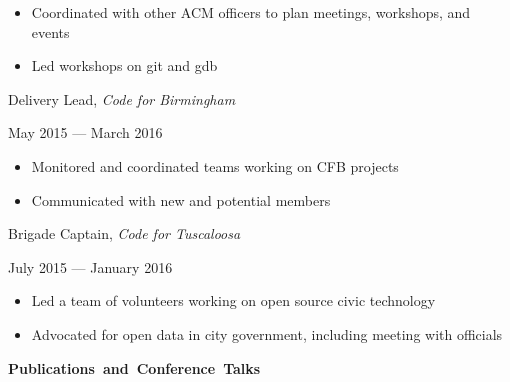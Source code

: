 \documentclass[11pt]{article}
\begin{document}
\begin{itemize}
  \item Coordinated with other ACM officers to plan meetings, workshops, and events
  \item Led workshops on git and gdb
\end{itemize}

\vspace{0.4em}
\begin{minipage}[t]{0.65\textwidth}
\flushleft
Delivery Lead, \textit{Code for Birmingham}\\
\end{minipage}
\begin{minipage}[t]{0.30\textwidth}
\flushright
May 2015 --- March 2016\\
\end{minipage}

\begin{itemize}
  \item Monitored and coordinated teams working on CFB projects
  \item Communicated with new and potential members
\end{itemize}

\begin{minipage}[t]{0.65\textwidth}
\flushleft
Brigade Captain, \textit{Code for Tuscaloosa}\\
\end{minipage}
\begin{minipage}[t]{0.30\textwidth}
\flushright
July 2015 --- January 2016\\
\end{minipage}

\begin{itemize}
  \item Led a team of volunteers working on open source civic technology
  \item Advocated for open data in city government, including meeting with officials
\end{itemize}

\newpage

\vspace{0.6em}
\hbox{\large \textbf{Publications and Conference Talks}}
\end{document}
